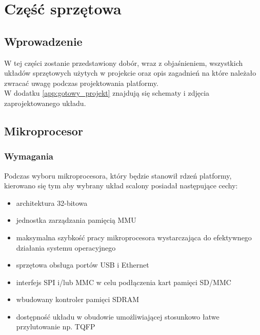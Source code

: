\documentclass[a4paper,12pt]{book}
\begin{document}

	\chapter{Część sprzętowa}
		\section{Wprowadzenie}
			W tej części zostanie przedstawiony dobór, wraz z objaśnieniem, wszystkich układów sprzętowych użytych w projekcie oraz opis zagadnień na które należało zwracać uwagę podczas projektowania platformy.\\
			W dodatku \ref{app:gotowy_projekt} znajdują się schematy i zdjęcia zaprojektowanego układu.
		\section{Mikroprocesor}
			\subsection{Wymagania}
				Podczas wyboru mikroprocesora, który będzie stanowił rdzeń platformy, kierowano się tym aby wybrany układ scalony posiadał następujące cechy:
				\begin{itemize}
					\item architektura 32-bitowa
					\item jednostka zarządzania pamięcią MMU
					\item maksymalna szybkość pracy mikroprocesora wystarczająca do efektywnego działania systemu operacyjnego
					\item sprzętowa obsługa portów USB i Ethernet
					\item interfejs SPI i/lub MMC w celu podłączenia kart pamięci SD/MMC
					\item wbudowany kontroler pamięci SDRAM
					\item dostępność układu w obudowie umożliwiającej stosunkowo łatwe przylutowanie np. TQFP
				\end{itemize}
\end{document}
